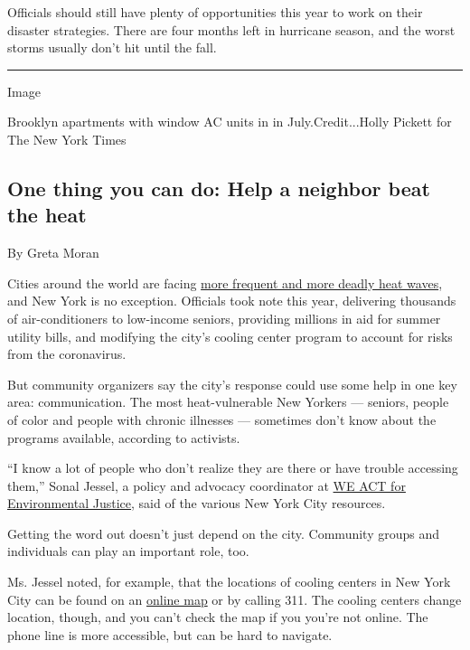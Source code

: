 Officials should still have plenty of opportunities this year to work on
their disaster strategies. There are four months left in hurricane
season, and the worst storms usually don't hit until the fall.

\begin{center}\rule{0.5\linewidth}{\linethickness}\end{center}

Image

Brooklyn apartments with window AC units in in July.Credit...Holly
Pickett for The New York Times

\hypertarget{one-thing-you-can-do-help-a-neighbor-beat-the-heat}{%
\subsection{One thing you can do: Help a neighbor beat the
heat}\label{one-thing-you-can-do-help-a-neighbor-beat-the-heat}}

By Greta Moran

Cities around the world are facing
\href{https://www.nytimes.com/2019/07/18/climate/heatwave-climate-change.html}{more
frequent and more deadly heat waves}, and New York is no exception.
Officials took note this year, delivering thousands of air-conditioners
to low-income seniors, providing millions in aid for summer utility
bills, and modifying the city's cooling center program to account for
risks from the coronavirus.

But community organizers say the city's response could use some help in
one key area: communication. The most heat-vulnerable New Yorkers ---
seniors, people of color and people with chronic illnesses --- sometimes
don't know about the programs available, according to activists.

``I know a lot of people who don't realize they are there or have
trouble accessing them,'' Sonal Jessel, a policy and advocacy
coordinator at \href{https://www.weact.org/}{WE ACT for Environmental
Justice}, said of the various New York City resources.

Getting the word out doesn't just depend on the city. Community groups
and individuals can play an important role, too.

Ms. Jessel noted, for example, that the locations of cooling centers in
New York City can be found on an
\href{https://maps.nyc.gov/cooling-center/inactive.html?1596560400000}{online
map} or by calling 311. The cooling centers change location, though, and
you can't check the map if you you're not online. The phone line is more
accessible, but can be hard to navigate.

